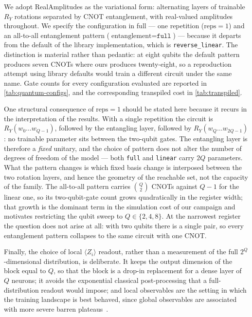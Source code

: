 \documentclass[aps,floatfix,superscriptaddress,twocolumn,tightenlines,amsmath,amssymb,nofootinbib,10pt,longbibliography,prl]{revtex4-2}
\begin{document}
We adopt RealAmplitudes as the variational form: alternating layers of
trainable $R_Y$ rotations separated by CNOT entanglement, with real-valued
amplitudes throughout. We specify the configuration in full --- one repetition
($\text{reps} = 1$) and an all-to-all entanglement pattern
($\text{entanglement} = \texttt{full}$) --- because it departs from the default
of the library implementation, which is \texttt{reverse\_linear}. The
distinction is material rather than pedantic: at eight qubits the default
pattern produces seven CNOTs where ours produces twenty-eight, so a
reproduction attempt using library defaults would train a different circuit
under the same name. Gate counts for every configuration evaluated are reported
in \ref{tab:quantum-configs}, and the corresponding transpiled cost in
\ref{tab:transpiled}.

One structural consequence of $\text{reps} = 1$ should be stated here because
it recurs in the interpretation of the results. With a single repetition the
circuit is $R_Y(w_0 \ldots w_{Q-1})$, followed by the entangling layer,
followed by $R_Y(w_Q \ldots w_{2Q-1})$: no trainable parameter sits between the
two-qubit gates. The entangling layer is therefore a \emph{fixed} unitary, and
the choice of pattern does not alter the number of degrees of freedom of the
model --- both \texttt{full} and \texttt{linear} carry $2Q$ parameters. What the
pattern changes is which fixed basis change is interposed between the two
rotation layers, and hence the geometry of the reachable set, not the capacity
of the family. The all-to-all pattern carries $\binom{Q}{2}$ CNOTs against
$Q-1$ for the linear one, so its two-qubit-gate count grows quadratically in
the register width; that growth is the dominant term in the simulation cost of
our campaign and motivates restricting the qubit sweep to $Q \in \{2,4,8\}$. At
the narrowest register the question does not arise at all: with two qubits
there is a single pair, so every entanglement pattern collapses to the same
circuit with one CNOT.

Finally, the choice of local $\langle Z_i \rangle$ readout, rather than a
measurement of the full $2^Q$-dimensional distribution, is deliberate. It keeps
the output dimension of the block equal to $Q$, so that the block is a drop-in
replacement for a dense layer of $Q$ neurons; it avoids the exponential
classical post-processing that a full-distribution readout would impose; and
local observables are the setting in which the training landscape is best
behaved, since global observables are associated with more severe barren
plateaus~\cite{mcclean2018,cerezo2021}.
\end{document}
